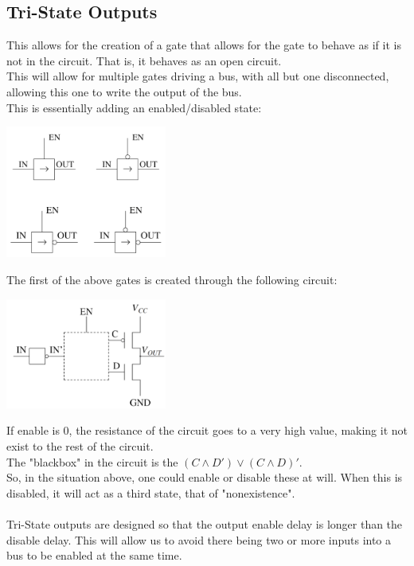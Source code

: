 \documentclass[nobib]{tufte-handout}
\begin{document}
    \subsection{Tri-State Outputs}
    This allows for the creation of a gate that allows for the gate to behave as if
    it is not in the circuit. That is, it behaves as an open circuit.\\ This will
    allow for multiple gates driving a bus, with all but one disconnected, allowing
    this one to write the output of the bus.\\ This is essentially adding an
    enabled/disabled state:
    \begin{center}
        \includegraphics[width = 200px]{images/enable_gates.png}
    \end{center}
    The first of the above gates is created through the following circuit:
    \begin{center}
        \includegraphics[width = 200px]{images/enable_circuit.png}
    \end{center}
    If enable is 0, the resistance of the circuit goes to a very high value, making it not exist to the rest of the circuit.\\
    The "blackbox" in the circuit is the $(C\land D')\lor(C\land D)'$.\\
    So, in the situation above, one could enable or disable these at will. When this is disabled, it will act as a third state, that of "nonexistence".\\~\\
    Tri-State outputs are designed so that the output enable delay is longer than the disable delay. This will allow us to avoid there being two or more inputs into a bus to be enabled at the same time.\\
\end{document}
